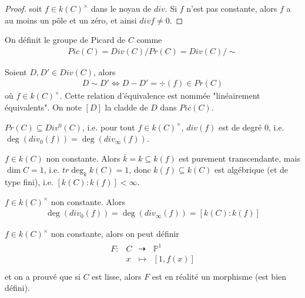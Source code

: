             \begin{proof}
                soit $f \in k(C)^\times$ dans le noyau de $div$. Si $f$ n'est pas constante, alors $f$ a au moins un pôle et un zéro, et ainsi $div f \neq 0$.
            \end{proof}
            \begin{defi}
                On définit le groupe de Picard de $C$ comme
                \begin{align*}
                    Pic(C) = Div(C)/Pr(C) = Div(C)/\sim
                \end{align*}
            \end{defi}
            \begin{nota}
                Soient $D,D' \in Div(C)$, alors
                \begin{align*}
                    D \sim D' \iff D - D' = \div(f) \in Pr(C)
                \end{align*}
                où $f\in k(C)^\times$. Cette relation d'équivalence est nommée "linéairement équivalents". On note $[D]$ la cladde de $D$ dans $Pic(C)$.
            \end{nota}
            \begin{theo}
                \label{*}
                $Pr(C) \subseteq Div^0(C)$, i.e. pour tout $f \in k(C)^\times$, $div(f)$ est de degré $0$, i.e. $\deg (div_0(f)) = \deg (div_\infty(f))$.
            \end{theo}
            \begin{remq}
                $f \in k(C)$ non constante. Alors $\bar k = k \subseteq k(f)$ est purement transcendante, mais $\dim C = 1$, i.e. $tr \deg_kk(C) = 1$, donc $k(f) \subseteq k(C)$ est algébrique (et de type fini), i.e. $[k(C) : k(f)] < \infty$.
            \end{remq}
            \begin{theo}
                \label{**}
                $f \in k(C)^\times$ non constante. Alors
                \begin{align*}
                    \deg(div_0(f)) = \deg(div_\infty(f)) = [k(C):k(f)]
                \end{align*}
            \end{theo}
            \begin{remq}
                $f \in k(C)^\times$ non constante, alors on peut définir
                \begin{align*}
                    \begin{array}{cccc}
                        F : & C & \dashrightarrow & \mathbb{P}^1 \\
                        & x & \mapsto & [1, f(x)]\\
                    \end{array}
                \end{align*}
                et on a prouvé que si $C$ est lisse, alors $F$ est en réalité un morphisme (est bien défini).
            \end{remq}
